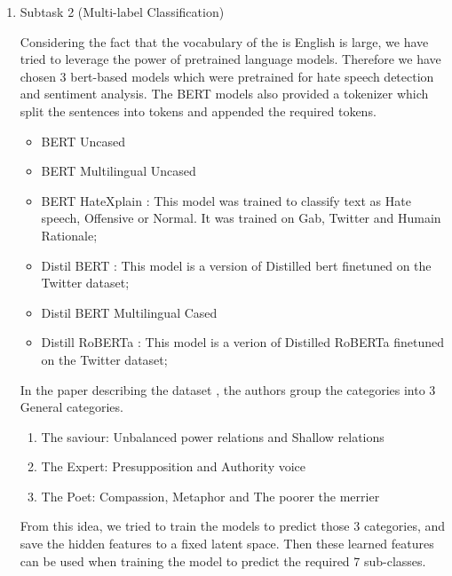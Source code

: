 \documentclass[11pt]{article}
\begin{document}
\begin{enumerate}
	\item Subtask 2 (Multi-label Classification)

	      Considering the fact that the vocabulary of the is English is large,
	      we have tried to leverage the power of pretrained language models.
	      Therefore we have chosen 3 bert-based models which were pretrained
	      for hate speech detection and sentiment analysis. The BERT models
	      also provided a tokenizer which split the sentences into tokens and
	      appended the required tokens.

	      \begin{itemize}
		      \item BERT \cite{bert} Uncased

		      \item  BERT Multilingual Uncased

		      \item BERT HateXplain \cite{mathew2020hatexplain}: This model was trained to classify text as Hate speech, Offensive or Normal.
		            It was trained on Gab, Twitter and Humain Rationale;

		      \item Distil BERT : This model is a version of Distilled bert finetuned on the Twitter dataset;

		      \item Distil BERT Multilingual Cased \cite{DistilBERT}

		      \item Distill RoBERTa : This model is a verion of Distilled RoBERTa finetuned on the Twitter dataset;
	      \end{itemize}

	      In the paper describing the dataset \cite{perezalmendros2020dont},
	      the authors group the categories into 3 General categories.

	      \begin{enumerate}
		      \item The saviour: Unbalanced power relations and Shallow relations

		      \item  The Expert: Presupposition and Authority voice

		      \item The Poet: Compassion, Metaphor and The poorer the merrier

	      \end{enumerate}

	      From this idea, we tried to train the models to predict those 3
	      categories, and save the hidden features to a fixed latent space.
	      Then these learned features can be used when training the model to
	      predict the required 7 sub-classes.


\end{enumerate}
\end{document}
